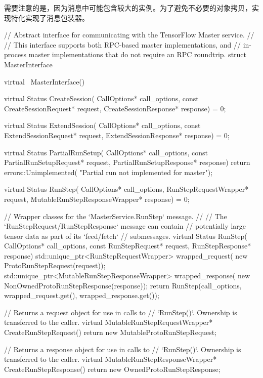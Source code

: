 \begin{content}
\begin{content}
需要注意的是，因为消息中可能包含较大的实例。为了避免不必要的对象拷贝，实现特化实现了消息包装器。

\begin{leftbar}
\begin{c++}
// Abstract interface for communicating with the TensorFlow Master service.
//
// This interface supports both RPC-based master implementations, and
// in-process master implementations that do not require an RPC roundtrip.
struct MasterInterface {
  virtual ~MasterInterface() {}
  
  virtual Status CreateSession(
      CallOptions* call_options,
      const CreateSessionRequest* request,
      CreateSessionResponse* response) = 0;

  virtual Status ExtendSession(
      CallOptions* call_options,
      const ExtendSessionRequest* request,
      ExtendSessionResponse* response) = 0;

  virtual Status PartialRunSetup(
      CallOptions* call_options,
      const PartialRunSetupRequest* request,
      PartialRunSetupResponse* response) {
    return errors::Unimplemented(
      "Partial run not implemented for master");
  }

  virtual Status RunStep(
      CallOptions* call_options,
      RunStepRequestWrapper* request,
      MutableRunStepResponseWrapper* response) = 0;

  // Wrapper classes for the `MasterService.RunStep` message.
  //
  // The `RunStepRequest/RunStepResponse` message can contain 
  // potentially large tensor data as part of its `feed/fetch` 
  // submessages.
  virtual Status RunStep(
    CallOptions* call_options,
    const RunStepRequest* request,
    RunStepResponse* response) {
    std::unique_ptr<RunStepRequestWrapper> wrapped_request(
        new ProtoRunStepRequest(request));
    std::unique_ptr<MutableRunStepResponseWrapper> wrapped_response(
        new NonOwnedProtoRunStepResponse(response));
    return RunStep(call_options, 
        wrapped_request.get(), 
        wrapped_response.get());
  }

  // Returns a request object for use in calls to
  // `RunStep()`. Ownership is transferred to the caller.
  virtual MutableRunStepRequestWrapper* CreateRunStepRequest() {
    return new MutableProtoRunStepRequest;
  }

  // Returns a response object for use in calls to
  // `RunStep()`. Ownership is transferred to the caller.
  virtual MutableRunStepResponseWrapper* CreateRunStepResponse() {
    return new OwnedProtoRunStepResponse;
  }

}
\end{c++}
\end{leftbar}
\end{content}
\end{content}
